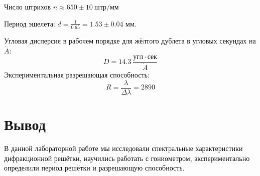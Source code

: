 \documentclass[10pt, a4paper]{article}
\begin{document}
Число штрихов $n \approx 650 \pm 10\ штр/мм$

Период эшелета: $d = \frac{1}{0.65} = 1.53 \pm 0.04$ мм.

Угловая дисперсия в рабочем порядке для жёлтого дублета в угловых секундах на $\dot A$:
\[
D = 14.3\ \frac{угл \cdot сек}{\dot A}
\]
Экспериментальная разрешающая способность:
\[
R = \frac{\lambda}{\Delta \lambda} = 2890
\]
\newpage
\section*{Вывод}
В данной лабораторной работе мы исследовали спектральные характеристики дифракционной решётки, научились работать с гониометром, экспериментально определили период решётки и  разрешающую способность.
\end{document}
